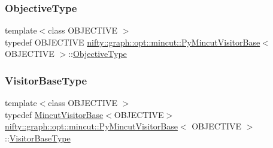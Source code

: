 \mbox{\label{classnifty_1_1graph_1_1opt_1_1mincut_1_1PyMincutVisitorBase_a2b620db205e661bd3dedede448cb8ca6}} 
\subsubsection{\texorpdfstring{Objective\+Type}{ObjectiveType}}
{\footnotesize\ttfamily template$<$class O\+B\+J\+E\+C\+T\+I\+VE $>$ \\
typedef O\+B\+J\+E\+C\+T\+I\+VE \hyperlink{classnifty_1_1graph_1_1opt_1_1mincut_1_1PyMincutVisitorBase}{nifty\+::graph\+::opt\+::mincut\+::\+Py\+Mincut\+Visitor\+Base}$<$ O\+B\+J\+E\+C\+T\+I\+VE $>$\+::\hyperlink{classnifty_1_1graph_1_1opt_1_1mincut_1_1PyMincutVisitorBase_a2b620db205e661bd3dedede448cb8ca6}{Objective\+Type}}

\mbox{\label{classnifty_1_1graph_1_1opt_1_1mincut_1_1PyMincutVisitorBase_af4e0e98d9d903d41f506563262ef8fbe}} 
\subsubsection{\texorpdfstring{Visitor\+Base\+Type}{VisitorBaseType}}
{\footnotesize\ttfamily template$<$class O\+B\+J\+E\+C\+T\+I\+VE $>$ \\
typedef \hyperlink{namespacenifty_1_1graph_1_1opt_1_1mincut_af5f9546254de453f964641e936ad8ba3}{Mincut\+Visitor\+Base}$<$O\+B\+J\+E\+C\+T\+I\+VE$>$ \hyperlink{classnifty_1_1graph_1_1opt_1_1mincut_1_1PyMincutVisitorBase}{nifty\+::graph\+::opt\+::mincut\+::\+Py\+Mincut\+Visitor\+Base}$<$ O\+B\+J\+E\+C\+T\+I\+VE $>$\+::\hyperlink{classnifty_1_1graph_1_1opt_1_1mincut_1_1PyMincutVisitorBase_af4e0e98d9d903d41f506563262ef8fbe}{Visitor\+Base\+Type}}



